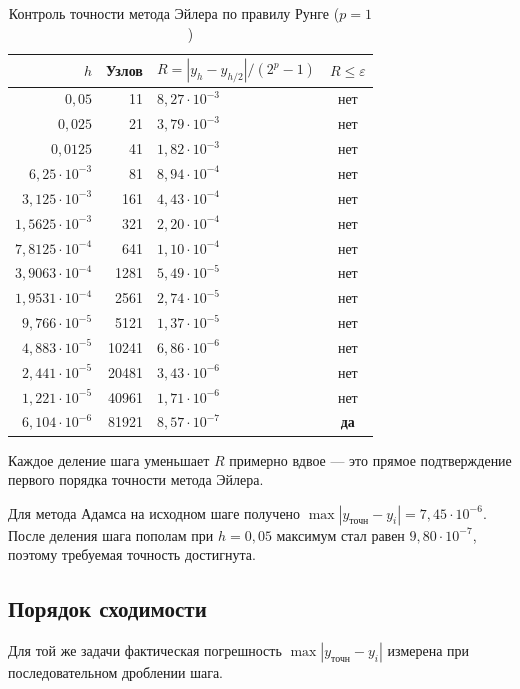 \documentclass[12pt,a4paper]{article}
\begin{document}
\begin{table}[H]\centering\small
\caption{Контроль точности метода Эйлера по правилу Рунге ($p=1$)}
\begin{tabular}{rrlc}\toprule
$h$ & Узлов & $R=|y_h-y_{h/2}|/(2^p-1)$ & $R\le\varepsilon$\\\midrule
$0{,}05$ & 11 & $8{,}27\cdot10^{-3}$ & нет\\
$0{,}025$ & 21 & $3{,}79\cdot10^{-3}$ & нет\\
$0{,}0125$ & 41 & $1{,}82\cdot10^{-3}$ & нет\\
$6{,}25\cdot10^{-3}$ & 81 & $8{,}94\cdot10^{-4}$ & нет\\
$3{,}125\cdot10^{-3}$ & 161 & $4{,}43\cdot10^{-4}$ & нет\\
$1{,}5625\cdot10^{-3}$ & 321 & $2{,}20\cdot10^{-4}$ & нет\\
$7{,}8125\cdot10^{-4}$ & 641 & $1{,}10\cdot10^{-4}$ & нет\\
$3{,}9063\cdot10^{-4}$ & 1281 & $5{,}49\cdot10^{-5}$ & нет\\
$1{,}9531\cdot10^{-4}$ & 2561 & $2{,}74\cdot10^{-5}$ & нет\\
$9{,}766\cdot10^{-5}$ & 5121 & $1{,}37\cdot10^{-5}$ & нет\\
$4{,}883\cdot10^{-5}$ & 10241 & $6{,}86\cdot10^{-6}$ & нет\\
$2{,}441\cdot10^{-5}$ & 20481 & $3{,}43\cdot10^{-6}$ & нет\\
$1{,}221\cdot10^{-5}$ & 40961 & $1{,}71\cdot10^{-6}$ & нет\\
$6{,}104\cdot10^{-6}$ & 81921 & $8{,}57\cdot10^{-7}$ & \textbf{да}\\\bottomrule
\end{tabular}\end{table}

Каждое деление шага уменьшает $R$ примерно вдвое --- это прямое
подтверждение первого порядка точности метода Эйлера.

Для метода Адамса на исходном шаге получено
$\max|y_{\text{точн}}-y_i|=7{,}45\cdot10^{-6}$. После деления шага пополам
при $h=0{,}05$ максимум стал равен $9{,}80\cdot10^{-7}$, поэтому требуемая
точность достигнута.

\subsection{Порядок сходимости}
Для той же задачи фактическая погрешность
$\max|y_{\text{точн}}-y_i|$ измерена при последовательном дроблении шага.
\end{document}
